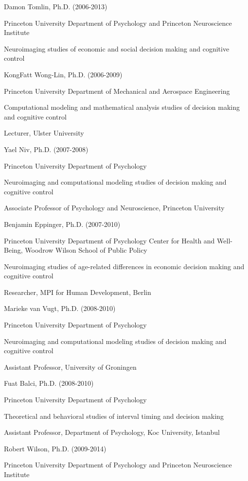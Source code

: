 \documentclass[10 pt]{article}
\begin{document}
Damon Tomlin, Ph.D. (2006-2013)

Princeton University Department of Psychology and Princeton Neuroscience Institute

Neuroimaging studies of economic and social decision making and cognitive control
    \medskip

KongFatt Wong-Lin, Ph.D. (2006-2009)

Princeton University Department of Mechanical and Aerospace Engineering

Computational modeling and mathematical analysis studies of decision making and cognitive control

Lecturer, Ulster University
    \medskip

Yael Niv, Ph.D. (2007-2008)

Princeton University Department of Psychology

Neuroimaging and computational modeling studies of decision making and cognitive control

Associate Professor of Psychology and Neuroscience, Princeton University
    \medskip

Benjamin Eppinger, Ph.D. (2007-2010)

Princeton University Department of Psychology
Center for Health and Well-Being, Woodrow Wilson School of Public Policy

Neuroimaging studies of age-related differences in economic decision making and cognitive control

Researcher, MPI for Human Development, Berlin
    \medskip

Marieke van Vugt, Ph.D. (2008-2010)

Princeton University Department of Psychology

Neuroimaging and computational modeling studies of decision making and cognitive control

Assistant Professor, University of Groningen
    \medskip

Fuat Balci, Ph.D. (2008-2010)

Princeton University Department of Psychology

Theoretical and behavioral studies of interval timing and decision making

Assistant Professor, Department of Psychology, Koc University, Istanbul
    \medskip

Robert Wilson, Ph.D. (2009-2014)

Princeton University Department of Psychology and Princeton Neuroscience Institute
\end{document}
